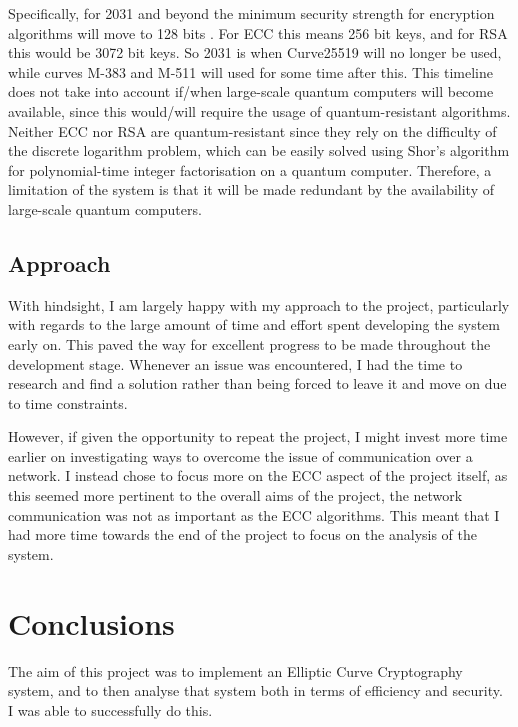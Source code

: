 \documentclass[12pt,a4paper]{article}
\begin{document}
Specifically, for 2031 and beyond the minimum security strength for encryption algorithms will move to 128 bits \cite[p59]{barker2020recommendation}. 
For ECC this means 256 bit keys, and for RSA this would be 3072 bit keys. 
So 2031 is when Curve25519 will no longer be used, while curves M-383 and M-511 will used for some time after this. 
This timeline does not take into account if/when large-scale quantum computers will become available, 
since this would/will require the usage of quantum-resistant algorithms. 
Neither ECC nor RSA are quantum-resistant since they rely on the difficulty of the discrete logarithm problem, 
which can be easily solved using Shor's algorithm for polynomial-time integer factorisation on a quantum computer. 
Therefore, a limitation of the system is that it will be made redundant by the availability of large-scale quantum computers. 


\subsection{Approach} \noindent \label{Approach}
With hindsight, I am largely happy with my approach to the project, particularly with regards to the large amount of time and effort spent developing the system early on. 
This paved the way for excellent progress to be made throughout the development stage. 
Whenever an issue was encountered, I had the time to research and find a solution rather than being forced to leave it and move on due to time constraints. 

However, if given the opportunity to repeat the project, I might invest more time earlier on investigating ways to overcome the issue of communication over a network. 
I instead chose to focus more on the ECC aspect of the project itself, as this seemed more pertinent to the overall aims of the project, the network communication was not as important as the ECC algorithms. 
This meant that I had more time towards the end of the project to focus on the analysis of the system. 



\section{Conclusions} \noindent
The aim of this project was to implement an Elliptic Curve Cryptography system, 
and to then analyse that system both in terms of efficiency and security. 
I was able to successfully do this. 
\end{document}
